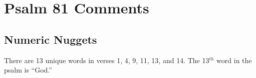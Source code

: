 \section{Psalm 81 Comments}

\subsection{Numeric Nuggets}
There are 13 unique words in verses 1, 4, 9, 11, 13, and 14. The 13$^{th}$ word in the psalm is ``God.''



